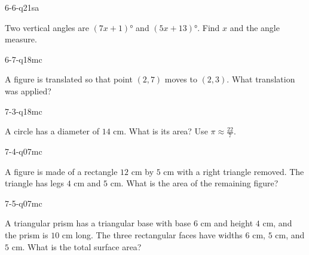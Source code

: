 \begin{practiceQuestion}{6-6-q21}{sa}
\begin{questionText}
Two vertical angles are $(7x + 1)°$ and $(5x + 13)°$. Find $x$ and the angle measure.
\end{questionText}
\end{practiceQuestion}

\begin{practiceQuestion}{6-7-q18}{mc}
\begin{questionText}
A figure is translated so that point $(2, 7)$ moves to $(2, 3)$. What translation was applied?
\end{questionText}
\end{practiceQuestion}

\begin{practiceQuestion}{7-3-q18}{mc}
\begin{questionText}
A circle has a diameter of $14$ cm. What is its area? Use $\pi \approx \frac{22}{7}$.
\end{questionText}
\end{practiceQuestion}

\begin{practiceQuestion}{7-4-q07}{mc}
\begin{questionText}
A figure is made of a rectangle $12$ cm by $5$ cm with a right triangle removed. The triangle has legs $4$ cm and $5$ cm. What is the area of the remaining figure?
\end{questionText}
\end{practiceQuestion}

\begin{practiceQuestion}{7-5-q07}{mc}
\begin{questionText}
A triangular prism has a triangular base with base $6$ cm and height $4$ cm, and the prism is $10$ cm long. The three rectangular faces have widths $6$ cm, $5$ cm, and $5$ cm. What is the total surface area?
\end{questionText}
\end{practiceQuestion}

